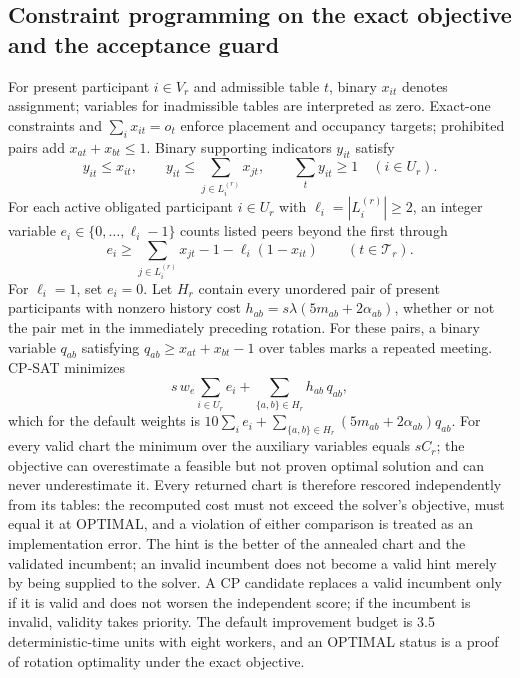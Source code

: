 \documentclass[11pt,a4paper]{article}
\theoremstyle{definition}\newtheorem{definition}[theorem]{Definition}
\theoremstyle{remark}\newtheorem{remark}[theorem]{Remark}
\begin{document}
\subsection{Constraint programming on the exact objective and the acceptance guard}\label{sec:cp}
For present participant $i\in V_r$ and admissible table $t$, binary $x_{it}$ denotes assignment; variables for inadmissible tables are interpreted as zero. Exact-one constraints and $\sum_i x_{it}=o_t$ enforce placement and occupancy targets; prohibited pairs add $x_{at}+x_{bt}\le1$. Binary supporting indicators $y_{it}$ satisfy
\begin{equation}
 y_{it}\le x_{it},\qquad y_{it}\le\sum_{j\in L_i^{(r)}}x_{jt},\qquad\sum_t y_{it}\ge1\quad(i\in U_r).
\end{equation}
For each active obligated participant $i\in U_r$ with $\ell_i=|L_i^{(r)}|\ge2$, an integer variable $e_i\in\{0,\ldots,\ell_i-1\}$ counts listed peers beyond the first through
\begin{equation}
 e_i\ge\sum_{j\in L_i^{(r)}}x_{jt}-1-\ell_i(1-x_{it})\qquad(t\in\mathcal T_r).
\end{equation}
For $\ell_i=1$, set $e_i=0$. Let $H_r$ contain every unordered pair of present participants with nonzero history cost $h_{ab}=s\lambda(5m_{ab}+2\alpha_{ab})$, whether or not the pair met in the immediately preceding rotation. For these pairs, a binary variable $q_{ab}$ satisfying $q_{ab}\ge x_{at}+x_{bt}-1$ over tables marks a repeated meeting. CP-SAT minimizes
\begin{equation}\label{eq:cp}
 s\,w_e\sum_{i\in U_r}e_i+\sum_{\{a,b\}\in H_r}h_{ab}\,q_{ab},
\end{equation}
which for the default weights is $10\sum_i e_i+\sum_{\{a,b\}\in H_r}(5m_{ab}+2\alpha_{ab})q_{ab}$. For every valid chart the minimum over the auxiliary variables equals $sC_r$; the objective can overestimate a feasible but not proven optimal solution and can never underestimate it. Every returned chart is therefore rescored independently from its tables: the recomputed cost must not exceed the solver's objective, must equal it at OPTIMAL, and a violation of either comparison is treated as an implementation error. The hint is the better of the annealed chart and the validated incumbent; an invalid incumbent does not become a valid hint merely by being supplied to the solver. A CP candidate replaces a valid incumbent only if it is valid and does not worsen the independent score; if the incumbent is invalid, validity takes priority. The default improvement budget is 3.5 deterministic-time units with eight workers, and an OPTIMAL status is a proof of rotation optimality under the exact objective.
\end{document}
